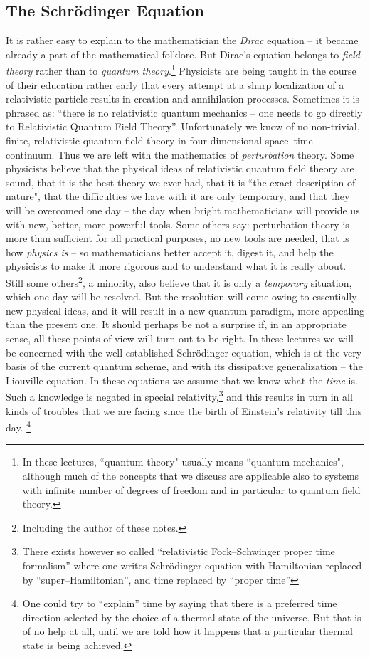 \documentclass[12pt]{article}
\begin{document}
\subsection{The Schr\"odinger Equation}

It is rather easy to explain to the mathematician the {\sl Dirac} equation --
it became already a part of the mathematical folklore.  But Dirac's equation
belongs to {\sl field theory} rather than to
{\sl quantum theory}.\footnote{In
these lectures, ``quantum theory" usually means
``quantum mechanics",  although much of the concepts that we discuss
are applicable also to systems with infinite number of degrees of
freedom and in particular to quantum field theory. } Physicists are being
taught in the course of their education rather early that every attempt at a
sharp localization of a relativistic particle results in creation and
annihilation processes.  Sometimes it is phrased as:  ``there is no relativistic
quantum mechanics -- one needs to go directly to Relativistic Quantum Field
Theory''.  Unfortunately we know of no non-trivial,  finite,  
relativistic quantum
field theory in four dimensional space--time continuum.  Thus we are left
with the mathematics of {\sl perturbation} theory.  Some physicists believe
that the physical ideas of relativistic quantum field theory are sound,  that
it is the best theory we ever had,  that it is ``the exact description of 
nature",  that
the difficulties we have with it are only temporary,  and that they will be 
overcomed one day --
the day when bright mathematicians will provide us with new,  better,  more
powerful tools.  Some others say:  perturbation theory is more than sufficient
for all practical purposes,  no new tools are needed,  that is how {\sl physics
is} -- so mathematicians better accept it,  digest it,  and help the physicists
to make it more rigorous and to understand what it is really about.  Still some
others\footnote{Including the  author of these notes. },  a
minority,  also believe that it is only a {\sl temporary} situation,  which
one day will be resolved.  But the resolution will come
owing to essentially
{new physical ideas}, 
and it will result in a new quantum paradigm,  more appealing than the
present one.  It should perhaps be not a surprise if, in an appropriate sense,  
all
these points of view will turn out to be right.  In these lectures we will be
concerned with the well established Schr\"odinger equation,  which is at the
very basis of the current quantum scheme,  and with its dissipative
generalization -- the Liouville equation. 
In these equations we assume that we 
know what the {\sl time} is.  Such a knowledge is negated in special
relativity,\footnote{There exists however so called ``relativistic
Fock--Schwinger proper time formalism'' \cite[Ch. 2--5--4]{itz} where
one writes Schr\"odinger equation with Hamiltonian replaced by
``super--Hamiltonian'',  and time replaced by ``proper time''} and this results
in turn in all kinds of troubles that we are facing since the birth of
Einstein's relativity till this day.%
\footnote{One could try to ``explain'' time by saying that there is a
preferred time direction selected by
the choice of a thermal state of the universe. But that is of no help
at all, until
we are told how it happens that a particular thermal state is
being achieved.}
\end{document}
